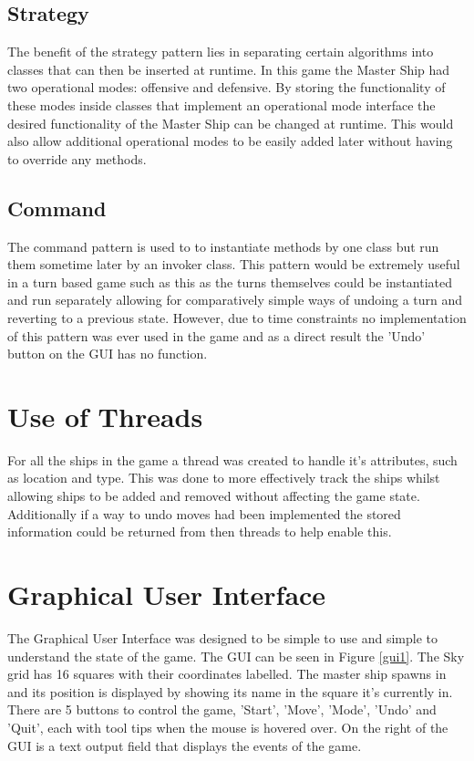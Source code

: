 \documentclass[conference,backref=page]{acmsiggraph}
\begin{document}
\subsection{Strategy}
The benefit of the strategy pattern lies in separating certain algorithms into classes that can then be inserted at runtime. In this game the Master Ship had two operational modes: offensive and defensive. By storing the functionality of these modes inside classes that implement an operational mode interface the desired functionality of the Master Ship can be changed at runtime. This would also allow additional operational modes to be easily added later without having to override any methods.

\subsection{Command}
The command pattern is used to to instantiate methods by one class but run them sometime later by an invoker class. This pattern would be extremely useful in a turn based game such as this as the turns themselves could be instantiated and run separately allowing for comparatively simple ways of undoing a turn and reverting to a previous state. However, due to time constraints no implementation of this pattern was ever used in the game and as a direct result the 'Undo' button on the GUI has no function.


\section{Use of Threads}
For all the ships in the game a thread was created to handle it's attributes, such as location and type. This was done to more effectively track the ships whilst allowing ships to be added and removed without affecting the game state. Additionally if a way to undo moves had been implemented the stored information could be returned from then threads to help enable this.


\section{Graphical User Interface}
The Graphical User Interface was designed to be simple to use and simple to understand the state of the game. The GUI can be seen in Figure \ref{gui1}. The Sky grid has 16 squares with their coordinates labelled. The master ship spawns in and its position is displayed by showing its name in the square it's currently in. There are 5 buttons to control the game, 'Start', 'Move', 'Mode', 'Undo' and 'Quit', each with tool tips when the mouse is hovered over. On the right of the GUI is a text output field that displays the events of the game.
\end{document}
